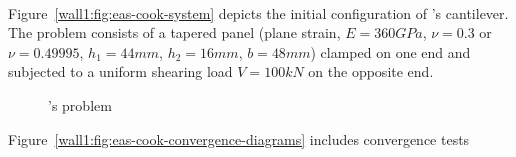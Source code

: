 \\
Figure~\ref{wall1:fig:eas-cook-system} depicts the initial configuration of
's cantilever. The 
problem consists of a tapered panel (plane strain, $E=360\unit{GPa}$,
$\nu=0.3$ or $\nu=0.49995$,
$h_1=44\unit{mm}$, $h_2=16\unit{mm}$, $b=48\unit{mm}$) clamped on one end and
subjected to a uniform shearing load $V=100\unit{kN}$ on the opposite end. 
\begin{figure}[H]
  \begin{center}
  \end{center}
  \caption{'s problem}
  \label{wall1:fig:eas-cook-beam}
\end{figure}
Figure~\ref{wall1:fig:eas-cook-convergence-diagrams} includes convergence tests
